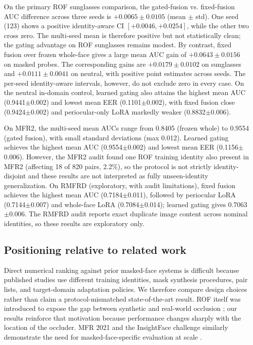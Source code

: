 \documentclass[10pt,journal,compsoc]{IEEEtran}
\begin{document}
On the primary ROF sunglasses comparison, the gated-fusion vs. fixed-fusion AUC difference across three seeds is $+0.0065\pm0.0105$ (mean $\pm$ std). One seed (123) shows a positive identity-aware CI $[+0.0046, +0.0254]$, while the other two cross zero. The multi-seed mean is therefore positive but not statistically clean; the gating advantage on ROF sunglasses remains modest. By contrast, fixed fusion over frozen whole-face gives a large mean AUC gain of $+0.0643\pm0.0156$ on masked probes. The corresponding gains are $+0.0179\pm0.0102$ on sunglasses and $+0.0111\pm0.0041$ on neutral, with positive point estimates across seeds. The per-seed identity-aware intervals, however, do not exclude zero in every case. On the neutral in-domain control, learned gating also attains the highest mean AUC (0.9441$\pm$0.002) and lowest mean EER (0.1101$\pm$0.002), with fixed fusion close (0.9424$\pm$0.002) and periocular-only LoRA markedly weaker (0.8832$\pm$0.006).

On MFR2, the multi-seed mean AUCs range from 0.8405 (frozen whole) to 0.9554 (gated fusion), with small standard deviations (max 0.012). Learned gating achieves the highest mean AUC (0.9554$\pm$0.002) and lowest mean EER (0.1156$\pm$0.006). However, the MFR2 audit found one ROF training identity also present in MFR2 (affecting 18 of 820 pairs, 2.2\%), so the protocol is not strictly identity-disjoint and these results are not interpreted as fully unseen-identity generalization. On RMFRD (exploratory, with audit limitations), fixed fusion achieves the highest mean AUC (0.7184$\pm$0.011), followed by periocular LoRA (0.7144$\pm$0.007) and whole-face LoRA (0.7084$\pm$0.014); learned gating gives 0.7063$\pm$0.006. The RMFRD audit reports exact duplicate image content across nominal identities, so these results are exploratory only.

\subsection{Positioning relative to related work}
Direct numerical ranking against prior masked-face systems is difficult because published studies use different training identities, mask synthesis procedures, pair lists, and target-domain adaptation policies. We therefore compare design choices rather than claim a protocol-mismatched state-of-the-art result. ROF itself was introduced to expose the gap between synthetic and real-world occlusion \cite{rof}; our results reinforce that motivation because performance changes sharply with the location of the occluder. MFR 2021 and the InsightFace challenge similarly demonstrate the need for masked-face-specific evaluation at scale \cite{mfr2021,insightfacemfr}.
\end{document}
